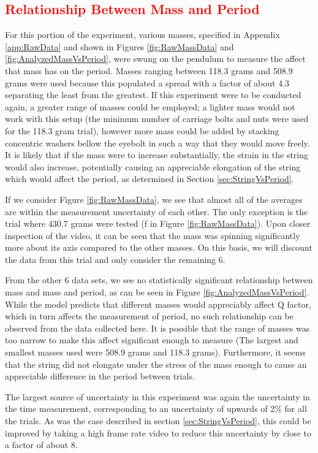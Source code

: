 \documentclass[11pt]{article}
\begin{document}
        \subsection{\textcolor{red}{Relationship Between Mass and Period}}\label{sec:PeriodVsMass}
        For this portion of the experiment, various masses, specified in Appendix \ref{app:RawData} and shown in Figures \ref{fig:RawMassData} and \ref{fig:AnalyzedMassVsPeriod}, were swung on the pendulum to measure the affect that mass has on the period. Masses ranging between 118.3 grams and 508.9 grams were used because this populated a spread with a factor of about 4.3 separating the least from the greatest. If this experiment were to be conducted again, a greater range of masses could be employed; a lighter mass would not work with this setup (the minimum number of carriage bolts and nuts were used for the 118.3 gram trial), however more mass could be added by stacking concentric washers bellow the eyebolt in such a way that they would move freely. It is likely that if the mass were to increase substantially, the strain in the string would also increase, potentially causing an appreciable elongation of the string which would affect the period, as determined in Section \ref{sec:StringVsPeriod}. 

        If we consider Figure \ref{fig:RawMassData}, we see that almost all of the averages are within the measurement uncertainty of each other. The only exception is the trial where 430.7 grams were tested (f in Figure \ref{fig:RawMassData}). Upon closer inspection of the video, it can be seen that the mass was spinning significantly more about its axis compared to the other masses. On this basis, we will discount the data from this trial and only consider the remaining 6.

        From the other 6 data sets, we see no statistically significant relationship between mass and mass and period, as can be seen in Figure \ref{fig:AnalyzedMassVsPeriod}. While the model predicts that different masses would appreciably affect Q factor, which in turn affects the measurement of period, no such relationship can be observed from the data collected here. It is possible that the range of masses was too narrow to make this affect significant enough to measure (The largest and smallest masses used were 508.9 grams and 118.3 grams). Furthermore, it seems that the string did not elongate under the stress of the mass enough to cause an appreciable difference in the period between trials.

        The largest source of uncertainty in this experiment was again the uncertainty in the time measurement, corresponding to an uncertainty of upwards of 2\% for all the trials. As was the case described in section \ref{sec:StringVsPeriod}, this could be improved by taking a high frame rate video to reduce this uncertainty by close to a factor of about 8. 
\end{document}
